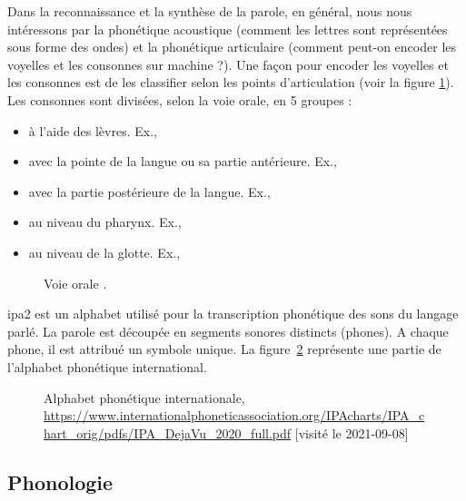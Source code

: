 \documentclass{KodeBook}
\begin{document}
Dans la reconnaissance et la synthèse de la parole, en général, nous nous intéressons par la phonétique acoustique (comment les lettres sont représentées sous forme des ondes) et la phonétique articulaire (comment peut-on encoder les voyelles et les consonnes sur machine ?).
Une façon pour encoder les voyelles et les consonnes est de les classifier selon les points d'articulation (voir la figure \ref{fig:articulation}). 
Les consonnes sont divisées, selon la voie orale, en 5 groupes :
\begin{itemize}
	\item {} à l'aide des lèvres. Ex., \expword{\textipa{[b], [p], [m], [f], [v]}}
	\item {} avec la pointe de la langue ou sa partie antérieure. 
	Ex., 
	\item {} avec la partie postérieure de la langue. Ex., 
	\item {} au niveau du pharynx. 
	Ex., 
	\item {} au niveau de la glotte. 
	Ex., 
\end{itemize}

\begin{figure}[!ht]
	\centering 
	\caption[Voie orale]{Voie orale \cite{2009-ball}. \label{fig:articulation}}
\end{figure}

\ac{ipa2} est un alphabet utilisé pour la transcription phonétique des sons du langage parlé.  
La parole est découpée en segments sonores distincts (phones). 
A chaque phone, il est attribué un symbole unique. 
La figure~\ref{fig:ipa} représente une partie de l'alphabet phonétique international.

\begin{figure}[!ht]
	\centering 
	\caption[Alphabet phonétique internationale : IPA]{Alphabet phonétique internationale, \url{https://www.internationalphoneticassociation.org/IPAcharts/IPA_chart_orig/pdfs/IPA_DejaVu_2020_full.pdf} [visité le 2021-09-08]}
	\label{fig:ipa}
\end{figure}


\subsection{Phonologie}
\end{document}
